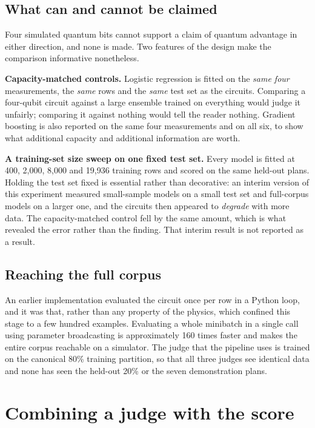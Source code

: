 \subsection{What can and cannot be claimed}

Four simulated quantum bits cannot support a claim of quantum advantage in
either direction, and none is made. Two features of the design make the
comparison informative nonetheless.

\textbf{Capacity-matched controls.} Logistic regression is fitted on the
\emph{same four} measurements, the \emph{same} rows and the \emph{same}
test set as the circuits. Comparing a four-qubit circuit against a large
ensemble trained on everything would judge it unfairly; comparing it
against nothing would tell the reader nothing. Gradient boosting is also
reported on the same four measurements and on all six, to show what
additional capacity and additional information are worth.

\textbf{A training-set size sweep on one fixed test set.} Every model is
fitted at 400, 2,000, 8,000 and 19,936 training rows and scored on the same
held-out plans. Holding the test set fixed is essential rather than
decorative: an interim version of this experiment measured small-sample
models on a small test set and full-corpus models on a larger one, and the
circuits then appeared to \emph{degrade} with more data. The
capacity-matched control fell by the same amount, which is what revealed
the error rather than the finding. That interim result is not reported as a
result.

\subsection{Reaching the full corpus}

An earlier implementation evaluated the circuit once per row in a Python
loop, and it was that, rather than any property of the physics, which
confined this stage to a few hundred examples. Evaluating a whole
minibatch in a single call using parameter broadcasting is approximately
160 times faster and makes the entire corpus reachable on a simulator. The
judge that the pipeline uses is trained on the canonical 80\% training
partition, so that all three judges see identical data and none has seen
the held-out 20\% or the seven demonstration plans.

\section{Combining a judge with the score}
\label{sec:blend}

